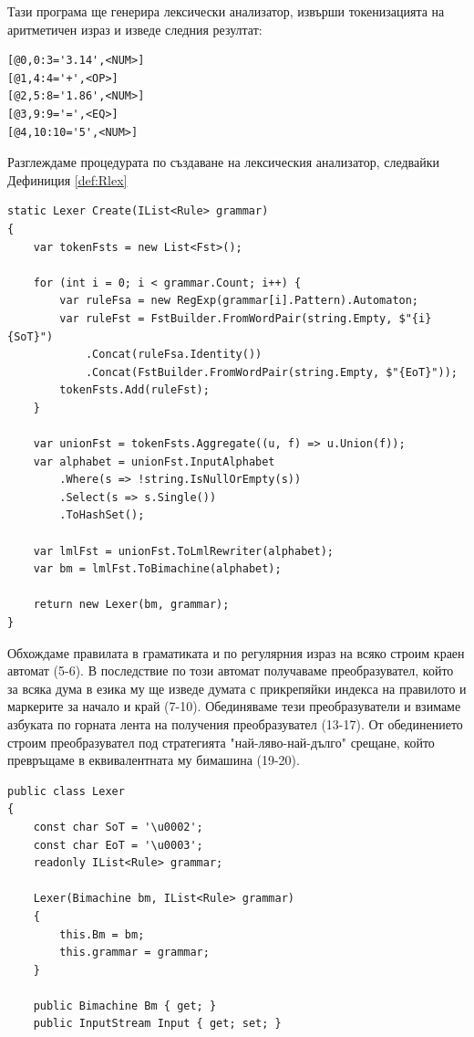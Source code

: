 \documentclass[12pt, oneside]{article}
\theoremstyle{definition}
\begin{document}
Тази програма ще генерира лексически анализатор, извърши токенизацията на аритметичен израз и изведе следния резултат:

\begin{verbatim}
[@0,0:3='3.14',<NUM>]
[@1,4:4='+',<OP>]
[@2,5:8='1.86',<NUM>]
[@3,9:9='=',<EQ>]
[@4,10:10='5',<NUM>]
\end{verbatim}

Разглеждаме процедурата по създаване на лексическия анализатор, следвайки Дефиниция \ref{def:Rlex}

\begin{verbatim}
static Lexer Create(IList<Rule> grammar)
{
	var tokenFsts = new List<Fst>();

	for (int i = 0; i < grammar.Count; i++) {
		var ruleFsa = new RegExp(grammar[i].Pattern).Automaton;
		var ruleFst = FstBuilder.FromWordPair(string.Empty, $"{i}{SoT}")
			.Concat(ruleFsa.Identity())
			.Concat(FstBuilder.FromWordPair(string.Empty, $"{EoT}"));
		tokenFsts.Add(ruleFst);
	}

	var unionFst = tokenFsts.Aggregate((u, f) => u.Union(f));
	var alphabet = unionFst.InputAlphabet
		.Where(s => !string.IsNullOrEmpty(s))
		.Select(s => s.Single())
		.ToHashSet();

	var lmlFst = unionFst.ToLmlRewriter(alphabet);
	var bm = lmlFst.ToBimachine(alphabet);

	return new Lexer(bm, grammar);
}
\end{verbatim}

 Обхождаме правилата в граматиката и по регулярния израз на всяко строим краен автомат (5-6). В последствие по този автомат получаваме преобразувател, който за всяка дума в езика му ще изведе думата с прикрепяйки индекса на правилото и маркерите за начало и край (7-10). Обединяваме тези преобразуватели и взимаме азбуката по горната лента на получения преобразувател (13-17). От обединението строим преобразувател под стратегията "най-ляво-най-дълго" срещане, който превръщаме в еквивалентната му бимашина (19-20).

\begin{verbatim}
public class Lexer
{
	const char SoT = '\u0002';
	const char EoT = '\u0003';
	readonly IList<Rule> grammar;

	Lexer(Bimachine bm, IList<Rule> grammar) 
	{
        this.Bm = bm;
        this.grammar = grammar;
    }

    public Bimachine Bm { get; }
	public InputStream Input { get; set; }

\end{verbatim}
\end{document}
